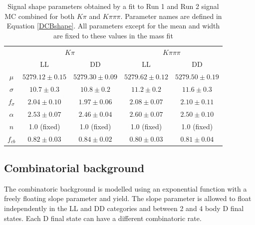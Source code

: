 \begin{table}[h]
\centering
\begin{tabular}{c|cc|cc}
\hline
& \multicolumn{2}{c}{$K\pi$} & \multicolumn{2}{c}{$K\pi\pi\pi$} \\
& LL & DD & LL & DD\\
\hline
$\mu$ & $5279.12 \pm 0.15$ & $5279.30 \pm 0.09$ & $5279.62 \pm 0.12$ & $5279.50 \pm 0.19$ \\
$\sigma$ & $10.7 \pm 0.3$ & $10.8 \pm 0.2$ & $11.2 \pm 0.2$ & $11.6 \pm 0.3$ \\
$f_{\sigma}$ & $2.04 \pm 0.10$ & $1.97 \pm 0.06$ & $2.08 \pm 0.07$ & $2.10 \pm 0.11$ \\
$\alpha$ & $2.53 \pm 0.07$ & $2.46 \pm 0.04$ & $2.60 \pm 0.07$ & $2.50 \pm 0.10$ \\
$n$ & 1.0 (fixed) & 1.0 (fixed) & 1.0 (fixed) & 1.0 (fixed) \\
$f_{cb}$ & $0.82 \pm 0.03$ & $0.84 \pm 0.02$ & $0.80 \pm 0.03$ & $0.81 \pm 0.04	$ \\
\hline
\end{tabular}
\caption{Signal shape parameters obtained by a fit to Run 1 and Run 2 signal MC combined for both $K\pi$ and $K\pi\pi\pi$. Parameter names are defined in Equation \ref{DCBshape}. All parameters except for the mean and width are fixed to these values in the mass fit}
\label{signalparameters}
\end{table}



\subsection{Combinatorial background}
\label{sec:massfit:combinatorial}

The combinatoric background is modelled using an exponential function with a freely floating slope parameter and yield. The slope parameter is allowed to float independently in the LL and DD categories and between 2 and 4 body D final states. Each D final state can have a different combinatoric rate.



